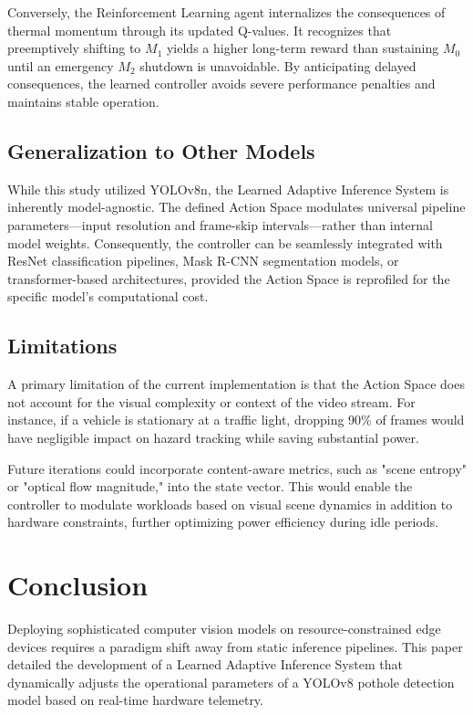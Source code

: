 \documentclass{ieeeaccess}
\begin{document}
Conversely, the Reinforcement Learning agent internalizes the consequences of thermal momentum through its updated Q-values. It recognizes that preemptively shifting to $M_1$ yields a higher long-term reward than sustaining $M_0$ until an emergency $M_2$ shutdown is unavoidable. By anticipating delayed consequences, the learned controller avoids severe performance penalties and maintains stable operation.

\subsection{Generalization to Other Models}
While this study utilized YOLOv8n, the Learned Adaptive Inference System is inherently model-agnostic. The defined Action Space modulates universal pipeline parameters—input resolution and frame-skip intervals—rather than internal model weights. Consequently, the controller can be seamlessly integrated with ResNet classification pipelines, Mask R-CNN segmentation models, or transformer-based architectures, provided the Action Space is reprofiled for the specific model's computational cost.

\subsection{Limitations}
A primary limitation of the current implementation is that the Action Space does not account for the visual complexity or context of the video stream. For instance, if a vehicle is stationary at a traffic light, dropping 90\% of frames would have negligible impact on hazard tracking while saving substantial power.

Future iterations could incorporate content-aware metrics, such as "scene entropy" or "optical flow magnitude," into the state vector. This would enable the controller to modulate workloads based on visual scene dynamics in addition to hardware constraints, further optimizing power efficiency during idle periods.

\section{Conclusion}
\label{sec:conclusion}
Deploying sophisticated computer vision models on resource-constrained edge devices requires a paradigm shift away from static inference pipelines. This paper detailed the development of a Learned Adaptive Inference System that dynamically adjusts the operational parameters of a YOLOv8 pothole detection model based on real-time hardware telemetry.
\end{document}
